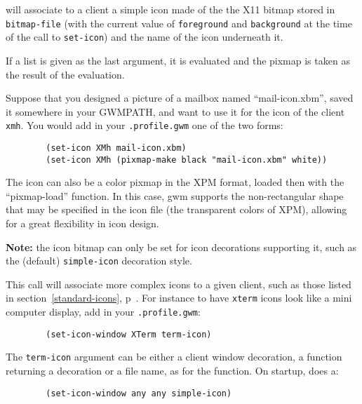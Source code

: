 \begin{description}
 \label{set-icon}
will associate to a client a simple icon made of the the X11 bitmap stored
in \verb"bitmap-file" (with the current value of \verb"foreground" and
\verb"background" at the time of the call to \verb"set-icon") and the name
of the icon underneath it. 

If a list is given as the last argument, it is evaluated and the pixmap is
taken as the result of the evaluation.

Suppose that you designed a picture of a mailbox named ``mail-icon.xbm'',
saved it somewhere in your GWMPATH, and want to use it for the icon of the
client \verb"xmh". You would add in your \verb".profile.gwm" one of the two
forms:

{\exemplefont\begin{verbatim}
        (set-icon XMh mail-icon.xbm)
        (set-icon XMh (pixmap-make black "mail-icon.xbm" white))
\end{verbatim}}

The icon can also be a color pixmap in the XPM format, loaded then with the
``pixmap-load'' function. In this case, gwm supports the non-rectangular shape
that may be specified in the icon file (the transparent colors of XPM),
allowing for a great flexibility in icon design.

{\bf Note:} the icon bitmap can only be set for icon decorations
supporting it, such as the (default) \verb"simple-icon" decoration style.

\label{set-icon-window} This
call will associate more complex icons to a given client, such as those
listed in section~\ref{standard-icons}, p~\pageref{standard-icons}. For
instance to have \verb"xterm" icons look like a mini computer display, add
in your \verb".profile.gwm":

{\exemplefont\begin{verbatim}
        (set-icon-window XTerm term-icon)
\end{verbatim}}

The \verb"term-icon" argument can be either a client window decoration, a
function returning a decoration or a file name, as for the 
function. On startup, {\GWM} does a:

{\exemplefont\begin{verbatim}
        (set-icon-window any any simple-icon)
\end{verbatim}}

\end{description}

